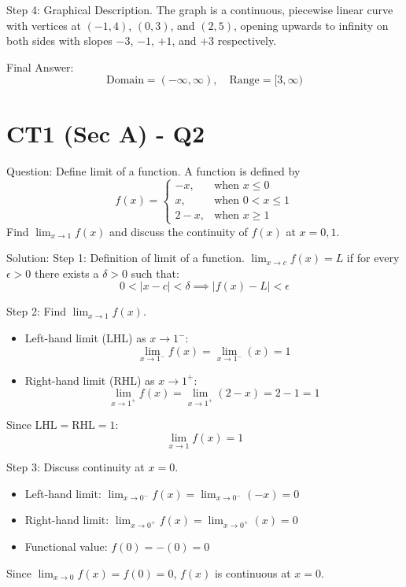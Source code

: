 \documentclass{article}
\begin{document}
Step 4: Graphical Description.
The graph is a continuous, piecewise linear curve with vertices at $(-1, 4)$, $(0, 3)$, and $(2, 5)$, opening upwards to infinity on both sides with slopes $-3$, $-1$, $+1$, and $+3$ respectively.

Final Answer:
\[
\boxed{\text{Domain} = (-\infty, \infty), \quad \text{Range} = [3, \infty)}
\]

\section*{CT1 (Sec A) - Q2}
Question:
Define limit of a function. A function is defined by
\[
f(x) = \begin{cases} 
-x, & \text{when } x \le 0 \\ 
x, & \text{when } 0 < x \le 1 \\ 
2-x, & \text{when } x \ge 1 
\end{cases}
\]
Find $\lim_{x \to 1} f(x)$ and discuss the continuity of $f(x)$ at $x = 0, 1$.

Solution:
Step 1: Definition of limit of a function.
$\lim_{x \to c} f(x) = L$ if for every $\epsilon > 0$ there exists a $\delta > 0$ such that:
\[
0 < |x-c| < \delta \implies |f(x) - L| < \epsilon
\]

Step 2: Find $\lim_{x \to 1} f(x)$.
\begin{itemize}
    \item Left-hand limit (LHL) as $x \to 1^-$:
    \[
    \lim_{x \to 1^-} f(x) = \lim_{x \to 1^-} (x) = 1
    \]
    \item Right-hand limit (RHL) as $x \to 1^+$:
    \[
    \lim_{x \to 1^+} f(x) = \lim_{x \to 1^+} (2-x) = 2 - 1 = 1
    \]
\end{itemize}
Since $\text{LHL} = \text{RHL} = 1$:
\[
\lim_{x \to 1} f(x) = 1
\]

Step 3: Discuss continuity at $x = 0$.
\begin{itemize}
    \item Left-hand limit: $\lim_{x \to 0^-} f(x) = \lim_{x \to 0^-} (-x) = 0$
    \item Right-hand limit: $\lim_{x \to 0^+} f(x) = \lim_{x \to 0^+} (x) = 0$
    \item Functional value: $f(0) = -(0) = 0$
\end{itemize}
Since $\lim_{x \to 0} f(x) = f(0) = 0$, $f(x)$ is continuous at $x = 0$.
\end{document}

